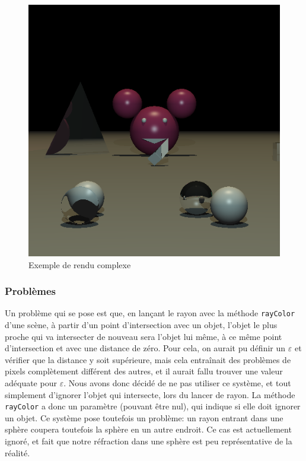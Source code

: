 \documentclass[a4paper]{article}
\begin{document}
    \begin{figure}[p]
      \includegraphics[width=\textwidth]{livrables/tests/raytracer/complet.png}
      \caption{Exemple de rendu complexe}
    \end{figure}

    \subsubsection{Problèmes}

    Un problème qui se pose est que, en lançant le rayon avec la méthode \verb+rayColor+ d'une scène,
    à partir d'un point d'intersection avec un objet, l'objet le plus proche qui va intersecter de nouveau
    sera l'objet lui même, à ce même point d'intersection et avec une distance de zéro.
    Pour cela, on aurait pu définir un $\varepsilon$ et vérifier que la distance y soit supérieure, mais
    cela entraînait des problèmes de pixels complètement différent des autres, et il aurait fallu trouver
    une valeur adéquate pour $\varepsilon$. Nous avons donc décidé de ne pas utiliser ce système, et tout
    simplement d'ignorer l'objet qui intersecte, lors du lancer de rayon.
    La méthode \verb+rayColor+ a donc un paramètre (pouvant être nul), qui indique si elle doit ignorer un objet.
    Ce système pose toutefois un problème: un rayon entrant dans une sphère coupera toutefois la sphère en un autre
    endroit. Ce cas est actuellement ignoré, et fait que notre réfraction dans une sphère est peu représentative de la réalité.
\end{document}
